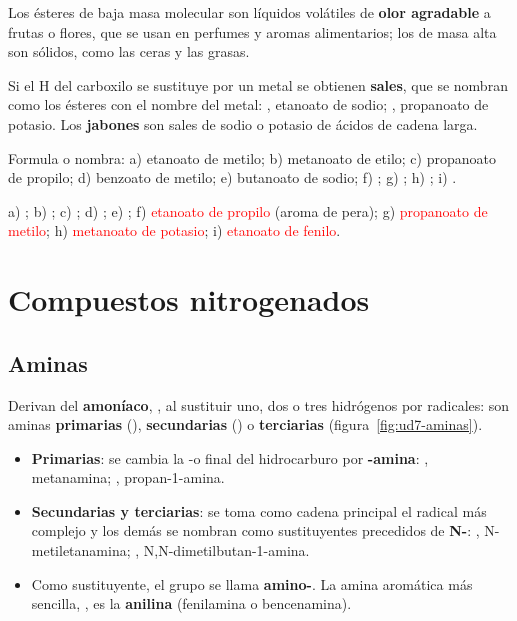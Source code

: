 Los ésteres de baja masa molecular son líquidos volátiles de \textbf{olor agradable} a frutas o flores, que se usan en perfumes y
aromas alimentarios; los de masa alta son sólidos, como las ceras y las grasas.

Si el H del carboxilo se sustituye por un metal se obtienen \textbf{sales}, que se nombran como los ésteres con el nombre del
metal: , etanoato de sodio; , propanoato de potasio. Los \textbf{jabones} son sales de sodio o
potasio de ácidos de cadena larga.

\begin{exercise}
    Formula o nombra: a) etanoato de metilo; b) metanoato de etilo; c) propanoato de propilo; d) benzoato de metilo;
    e) butanoato de sodio; f) ; g) ; h) ; i) .
    \begin{solu}
        a) \textcolor{red}{}; b) \textcolor{red}{}; c) \textcolor{red}{};
        d) \textcolor{red}{}; e) \textcolor{red}{}; f) \textcolor{red}{etanoato de propilo}
        (aroma de pera); g) \textcolor{red}{propanoato de metilo}; h) \textcolor{red}{metanoato de potasio};
        i) \textcolor{red}{etanoato de fenilo}.
    \end{solu}
\end{exercise}

\section{Compuestos nitrogenados}\label{sec:ud7-nitrogenados}

\subsection{Aminas}

Derivan del \textbf{amoníaco}, , al sustituir uno, dos o tres hidrógenos por radicales: son aminas \textbf{primarias}
(), \textbf{secundarias} () o \textbf{terciarias} (figura~\ref{fig:ud7-aminas}).
\begin{itemize}
    \item \textbf{Primarias}: se cambia la -o final del hidrocarburo por \textbf{-amina}: , metanamina;
    , propan-1-amina.
    \item \textbf{Secundarias y terciarias}: se toma como cadena principal el radical más complejo y los demás se nombran como
    sustituyentes precedidos de \textbf{N-}: , N-metiletanamina; ,
    N,N-dimetilbutan-1-amina.
    \item Como sustituyente, el grupo  se llama \textbf{amino-}. La amina aromática más sencilla, , es la
    \textbf{anilina} (fenilamina o bencenamina).
\end{itemize}

